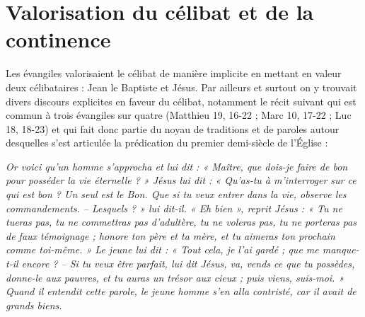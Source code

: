  

 


\section{Valorisation du célibat et de la continence}

 Les évangiles valorisaient le célibat de manière implicite en mettant en valeur deux célibataires : Jean le Baptiste et Jésus. Par ailleurs et surtout on y trouvait divers discours explicites en faveur du célibat, notamment le récit suivant qui est commun à trois évangiles sur quatre (Matthieu 19, 16-22 ; Marc 10, 17-22 ; Luc 18, 18-23) et qui fait donc partie du noyau de traditions et de paroles autour desquelles s'est articulée la prédication du premier demi-siècle de l'Église :

\begin{displayquote}[Mt~19,~16-22]
\emph{Or voici qu'un homme s'approcha et lui dit : « Maître, que dois-je faire de bon pour posséder la vie éternelle ? » Jésus lui dit : « Qu'as-tu à m'interroger sur ce qui est bon ? Un seul est le Bon. Que si tu veux entrer dans la vie, observe les commandements. -- Lesquels ? » lui dit-il. « Eh bien », reprit Jésus : « Tu ne tueras pas, tu ne commettras pas d'adultère, tu ne voleras pas, tu ne porteras pas de faux témoignage ; honore ton père et ta mère, et tu aimeras ton prochain comme toi-même. » Le jeune lui dit : « Tout cela, je l'ai gardé ; que me manque-t-il encore ? -- Si tu veux être parfait, lui dit Jésus, va, vends ce que tu possèdes, donne-le aux pauvres, et tu auras un trésor aux cieux ; puis viens, suis-moi. » Quand il entendit cette parole, le jeune homme s'en alla contristé, car il avait de grands biens.}
\end{displayquote}

